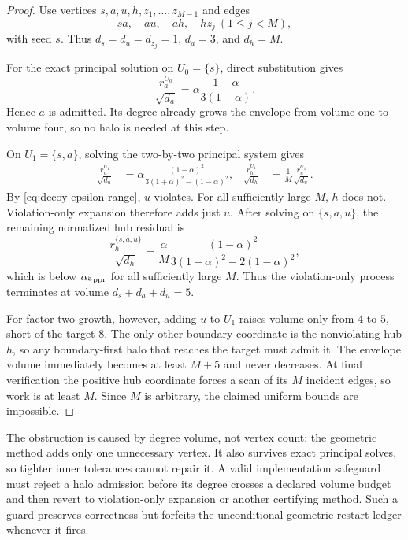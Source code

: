 \documentclass[11pt]{article}
\begin{document}
\begin{proof}
Use vertices $s,a,u,h,z_1,\ldots,z_{M-1}$ and edges
\begin{equation*}
 sa,\quad au,\quad ah,\quad hz_j\ (1\leq j<M),
\end{equation*}
with seed $s$. Thus
$d_s=d_u=d_{z_j}=1$, $d_a=3$, and $d_h=M$.

For the exact principal solution on $U_0=\{s\}$, direct substitution gives
\begin{equation}
 \frac{r^{U_0}_a}{\sqrt{d_a}}
 =\alpha\frac{1-\alpha}{3(1+\alpha)}.
 \label{eq:decoy-first-residual}
\end{equation}
Hence $a$ is admitted. Its degree already grows the envelope from volume one
to volume four, so no halo is needed at this step.

On $U_1=\{s,a\}$, solving the two-by-two principal system gives
\begin{align}
 \frac{r^{U_1}_u}{\sqrt{d_u}}
 &=\alpha\frac{(1-\alpha)^2}
 {3(1+\alpha)^2-(1-\alpha)^2},
 &
 \frac{r^{U_1}_h}{\sqrt{d_h}}
 &=\frac{1}{M}\frac{r^{U_1}_u}{\sqrt{d_u}}.
 \label{eq:decoy-second-residuals}
\end{align}
By \cref{eq:decoy-epsilon-range}, $u$ violates. For all sufficiently large
$M$, $h$ does not. Violation-only expansion therefore adds just $u$.
After solving on $\{s,a,u\}$, the remaining normalized hub residual is
\begin{equation}
 \frac{r^{\{s,a,u\}}_h}{\sqrt{d_h}}
 =\frac{\alpha}{M}
 \frac{(1-\alpha)^2}
 {3(1+\alpha)^2-2(1-\alpha)^2},
 \label{eq:decoy-literal-terminal}
\end{equation}
which is below $\alpha\varepsilon_{\mathrm{ppr}}$ for all sufficiently large $M$. Thus the
violation-only process terminates at volume
$d_s+d_a+d_u=5$.

For factor-two growth, however, adding $u$ to $U_1$ raises volume only from
$4$ to $5$, short of the target $8$. The only other boundary coordinate is
the nonviolating hub $h$, so any boundary-first halo that reaches the target
must admit it. The envelope volume immediately becomes at least $M+5$ and
never decreases. At final verification the positive hub coordinate forces a
scan of its $M$ incident edges, so work is at least $M$. Since $M$ is
arbitrary, the claimed uniform bounds are impossible.
\end{proof}

The obstruction is caused by degree volume, not vertex count: the geometric
method adds only one unnecessary vertex. It also survives exact principal
solves, so tighter inner tolerances cannot repair it. A valid implementation
safeguard must reject a halo admission before its degree crosses a declared
volume budget and then revert to violation-only expansion or another
certifying method. Such a guard preserves correctness but forfeits the
unconditional geometric restart ledger whenever it fires.
\end{document}
